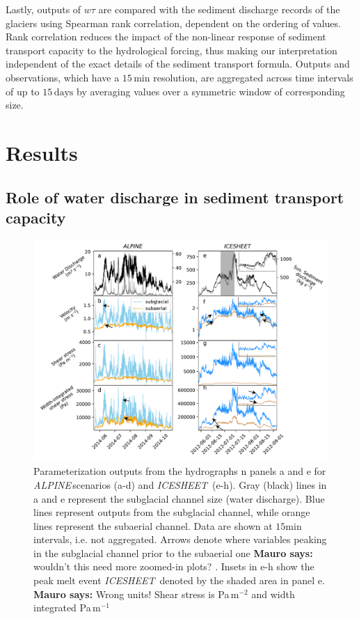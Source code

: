 \documentclass[draft]{agujournal2019}
\newcommand{\mauro}[1]{{\textbf{\color{green}Mauro says:} \color{green} #1} }
\newcommand{\alpine}{\textit{ALPINE}\,}
\newcommand{\icesheet}{\textit{ICESHEET}\,}
\newcommand{\unit}[1]{$\mathrm{#1}$}
\begin{document}
Lastly, outputs of $w\tau$ are compared with the sediment discharge records of the glaciers using Spearman rank correlation, dependent on the ordering of values.
Rank correlation reduces the impact of the non-linear response of sediment transport capacity to the hydrological forcing, thus making our interpretation independent of the exact details of the sediment transport formula.
Outputs and observations, which have a $15$\,\unit{min} resolution, are aggregated across time intervals of up to $15$\,\unit{days} by averaging values over a symmetric window of corresponding size.

\section{Results}

\subsection{Role of water discharge in sediment transport capacity}
\begin{figure}[h]
  \centering
  \includegraphics[width=0.9\linewidth]{Fig2.pdf}
  \caption{Parameterization outputs from the hydrographs n panels a and e for \alpine scenarios (a-d) and \icesheet{} (e-h).
    Gray (black) lines in a and e represent the subglacial channel size (water discharge).
    Blue lines represent outputs from the subglacial channel, while orange lines represent the subaerial channel.
    Data are shown at $15$\unit{min} intervals, i.e. not aggregated.
    Arrows denote where variables peaking in the subglacial channel prior to the subaerial one \mauro{wouldn't this need more zoomed-in plots?}.
    Insets in e-h show the  peak melt event \icesheet{} denoted by the shaded area in panel e.
        \mauro{Wrong units! Shear stress is Pa\,m$^{-2}$ and width integrated Pa\,m$^{-1}$}
  }
  \label{fig:model_outs}
\end{figure}
\end{document}
